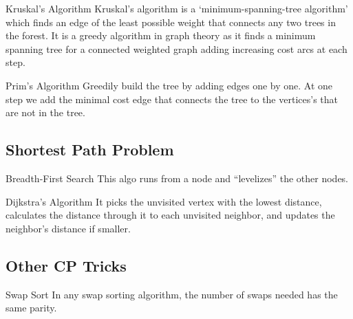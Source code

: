 {Kruskal's Algorithm}{
    Kruskal's algorithm is a `minimum-spanning-tree algorithm' which
    finds an edge of the least possible weight that connects any two trees in the
    forest. It is a greedy algorithm in graph theory as it finds a minimum
    spanning tree for a connected weighted graph adding increasing cost arcs at
    each step.
}



{Prim's Algorithm}{
    Greedily build the tree by adding edges one by one. At one step we
    add the minimal cost edge that connects the tree to the vertices's that are
    not in the tree.
}

\subsection{Shortest Path Problem}



{Breadth-First Search}{
    This algo runs from a node and ``levelizes'' the other nodes.
}


{Dijkstra's Algorithm}{
    It picks the unvisited vertex with the lowest distance, calculates
    the distance through it to each unvisited neighbor, and updates the neighbor's
    distance if smaller.
}


\subsection{Other CP Tricks}

\theo{}
{Swap Sort}{\label{theorem:swap_sort_steps_parity}
    In any swap sorting algorithm, the number of swaps needed has the same parity.
}

